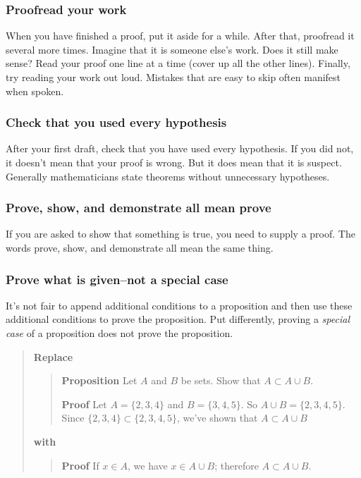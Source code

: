 \documentclass[12pt,fleqn]{article}
\newcounter{ex}\setcounter{ex}{0}
\newcounter{id}\setcounter{id}{0}
\newcounter{se}\setcounter{se}{0}
\begin{document}
 \subsubsection{ Proofread your work}

When you have finished a proof, put it aside for a while.  After that,
proofread it several more times. Imagine that it is someone else's
work.  Does it still make sense?  Read your proof one line at a time
(cover up all the other lines). Finally, try reading your work out
loud. Mistakes that are easy to skip often manifest when spoken.


 \subsubsection{Check that you used every hypothesis}

After your first draft, check that you have used every hypothesis.
If you did not, it doesn't mean that your proof is wrong.  But it
does mean that it is  suspect.  Generally mathematicians
state theorems without unnecessary hypotheses.

 \subsubsection{ Prove, show, and demonstrate all mean prove}

If you are asked to show that something is true, you need to
supply a proof.  The words prove, show, and demonstrate all mean the
same thing. 

 \subsubsection{ Prove what is given--not a special case}

It's not fair to append additional conditions to a proposition and 
then use these additional conditions to prove the proposition.  Put
differently, proving a {\em special case\/} of a proposition does not
prove the proposition. 

\begin{quote}
\textbf{Replace}
\begin{quote}
 \textbf {Proposition} Let \(A\) and \(B\) be sets.  Show that 
\(A \subset A \cup B\).

\vspace{0.1in}

\textbf{Proof} Let \(A = \{2,3,4\}\) and \(B = \{3,4,5\}\).  So
\mbox{\(A \cup B = \{2,3,4,5\}\)}.  Since \(\{2,3,4\} \subset \{2,3,4,5\}\),
we've shown that \(A \subset A \cup B\)
\end{quote}
\textbf{with}
\begin{quote}
 \textbf {Proof}  If \(x \in A\), we have \(x \in A \cup B\); therefore
\(A \subset A \cup B\).
\end{quote}
\end{quote}
\end{document}
